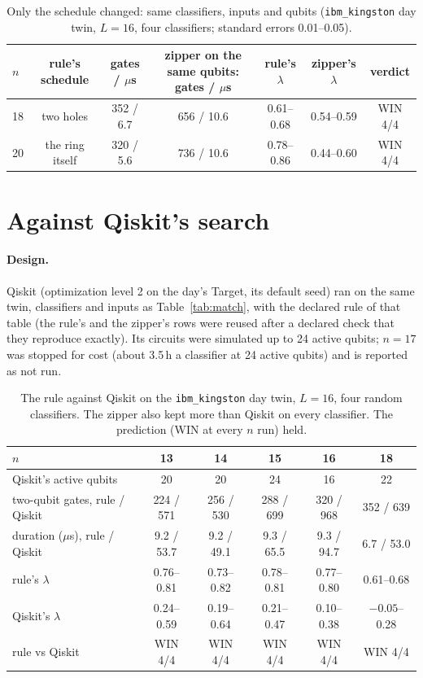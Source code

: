 \documentclass[11pt]{article}
\begin{document}
\begin{table}[h]
\centering
\small
\begin{tabular}{lcccccc}
\toprule
$n$ & rule's schedule & gates / $\mu$s & zipper on the same qubits: gates / $\mu$s & rule's $\lambda$ & zipper's $\lambda$ & verdict \\
\midrule
18 & two holes & 352 / 6.7 & 656 / 10.6 & 0.61--0.68 & 0.54--0.59 & WIN 4/4 \\
20 & the ring itself & 320 / 5.6 & 736 / 10.6 & 0.78--0.86 & 0.44--0.60 & WIN 4/4 \\
\bottomrule
\end{tabular}
\caption{Only the schedule changed: same classifiers, inputs and qubits (\texttt{ibm\_kingston} day twin, $L = 16$,
four classifiers; standard errors 0.01--0.05).}
\label{tab:samequbits}
\end{table}

\section{Against Qiskit's search}

\paragraph{Design.} Qiskit (optimization level 2 on the day's Target, its default seed) ran on the same twin, classifiers and
inputs as Table~\ref{tab:match}, with the declared rule of that table (the rule's and the zipper's rows were reused after
a declared check that they reproduce exactly). Its circuits were simulated up to 24 active qubits; $n = 17$ was stopped
for cost (about 3.5\,h a classifier at 24 active qubits) and is reported as not run.

\begin{table}[h]
\centering
\small
\begin{tabular}{lccccc}
\toprule
$n$ & 13 & 14 & 15 & 16 & 18 \\
\midrule
Qiskit's active qubits & 20 & 20 & 24 & 16 & 22 \\
two-qubit gates, rule / Qiskit & 224 / 571 & 256 / 530 & 288 / 699 & 320 / 968 & 352 / 639 \\
duration ($\mu$s), rule / Qiskit & 9.2 / 53.7 & 9.2 / 49.1 & 9.3 / 65.5 & 9.3 / 94.7 & 6.7 / 53.0 \\
rule's $\lambda$ & 0.76--0.81 & 0.73--0.82 & 0.78--0.81 & 0.77--0.80 & 0.61--0.68 \\
Qiskit's $\lambda$ & 0.24--0.59 & 0.19--0.64 & 0.21--0.47 & 0.10--0.38 & $-0.05$--0.28 \\
rule vs Qiskit & WIN 4/4 & WIN 4/4 & WIN 4/4 & WIN 4/4 & WIN 4/4 \\
\bottomrule
\end{tabular}
\caption{The rule against Qiskit on the \texttt{ibm\_kingston} day twin, $L = 16$, four random classifiers. The zipper
also kept more than Qiskit on every classifier. The prediction (WIN at every $n$ run) held.}
\label{tab:qiskit}
\end{table}
\end{document}
